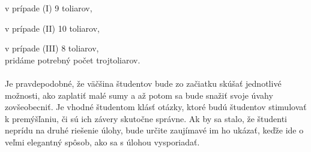 {v prípade (I) 9 toliarov,

v prípade (II) 10 toliarov,

v prípade (III) 8 toliarov, \\
pridáme potrebný počet trojtoliarov.\\
\\
\kom Je pravdepodobné, že väčšina študentov bude zo začiatku skúšať jednotlivé možnosti, ako zaplatiť malé sumy a až potom sa bude snažiť svoje úvahy zovšeobecniť. Je vhodné študentom klásť otázky, ktoré budú študentov stimulovať k premýšľaniu, či sú ich závery skutočne správne. Ak by sa stalo, že študenti neprídu na druhé riešenie úlohy, bude určite zaujímavé im ho ukázať, keďže ide o veľmi elegantný spôsob, ako sa s úlohou vysporiadať.\\
\\
}

